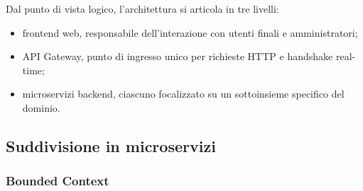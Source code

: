 Dal punto di vista logico, l'architettura si articola in tre livelli:

\begin{itemize}
	\item frontend web, responsabile dell'interazione con utenti finali e amministratori;
	\item API Gateway, punto di ingresso unico per richieste HTTP e handshake real-time;
	\item microservizi backend, ciascuno focalizzato su un sottoinsieme specifico del dominio.
\end{itemize}

\subsection{Suddivisione in microservizi}

\subsubsection{Bounded Context}

